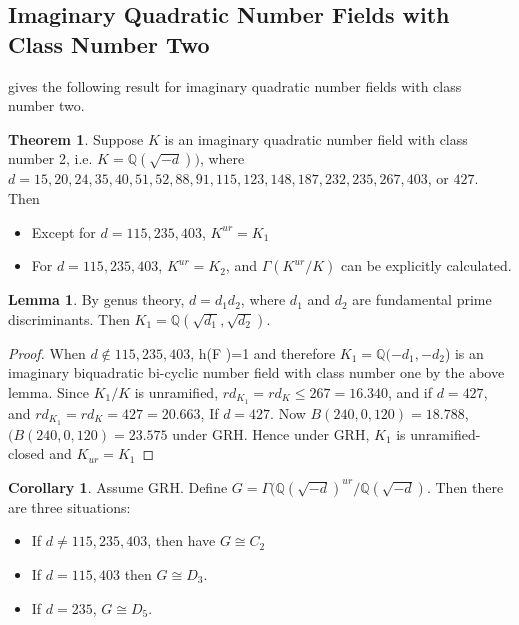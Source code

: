 \documentclass[12pt]{extarticle}
\newcommand{\Q}{\mathbb{Q}}
\newcommand{\<}{\langle}
\renewcommand{\>}{\rangle}
\theoremstyle{definition}
\newtheorem{theorem}{Theorem}
\newtheorem{corollary}{Corollary}
\newtheorem{lemma}{Lemma}
\begin{document}
\subsection{Imaginary Quadratic Number Fields with Class Number Two}
\cite{YAMAMURA1996} gives the following result for imaginary quadratic number fields with class number two.
\begin{theorem}
Suppose $K$ is an imaginary quadratic number field with class number 2, i.e. $K=\Q(\sqrt{-d}))$, where $d= 15, 20, 24, 35, 40, 51, 52, 88, 91, 115, 123, 148, 187, 232, 235, 267, 403$, or $427$. Then \begin{itemize}
\item Except for $d = 115, 235, 403$, $K^{ur} = K_1$
\item For $d = 115, 235, 403$,  $K^{ur} = K_2$, and $\Gamma(K^{ur}/K)$ can be explicitly calculated. 
\end{itemize}
\end{theorem}
\begin{lemma}
By genus theory, $d= d_1d_2$, where $d_1$ and $d_2$ are fundamental prime discriminants. Then $K_1 = \Q(\sqrt{d_1},\sqrt{d_2})$. 
\end{lemma}
\begin{proof}
When $d \not \in {115, 235, 403}$, h(F )=1 and therefore 
$K_1 =\Q(- d_1, - d_2 $) is an imaginary biquadratic bi-cyclic number field with class number one by the above lemma. Since $K_1/K$ is unramified,  $rd_{K_1}=rd_K \leq 267=16.340$, and if $d = 427$, and $rd_{K_1}=rd_K = 427=20.663$, If $d=427$. Now  $B(240, 0, 120) = 18.788$, $(B(240, 0, 120) = 23.575$ under GRH. Hence under GRH, $K_1$ is unramified-closed and $K_{ur}=K_1$ 
\end{proof}
\begin{corollary}
Assume GRH. Define $G = \Gamma(\Q(\sqrt{-d})^{ur}/\Q(\sqrt{-d})$. Then there are three situations:
\begin{itemize}
\item If $d \neq 115, 235, 403$, then have $ G \cong C_2$
\item If $d = 115,403$ then $G \cong D_3$.
\item If $d =  235$, $G \cong D_5$. 
\end{itemize}
\end{corollary}
\end{document}
